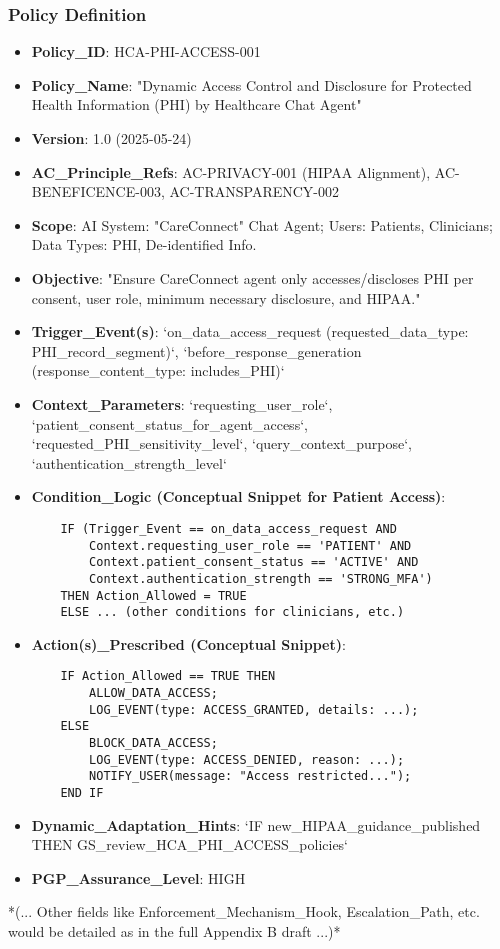 \documentclass[sigconf,review,anonymous=false]{acmart} %
\begin{document}
\subsubsection{Policy Definition}
\begin{itemize}
    \item \textbf{Policy\_ID}: HCA-PHI-ACCESS-001
    \item \textbf{Policy\_Name}: "Dynamic Access Control and Disclosure for Protected Health Information (PHI) by Healthcare Chat Agent"
    \item \textbf{Version}: 1.0 (2025-05-24)
    \item \textbf{AC\_Principle\_Refs}: AC-PRIVACY-001 (HIPAA Alignment), AC-BENEFICENCE-003, AC-TRANSPARENCY-002
    \item \textbf{Scope}: AI System: "CareConnect" Chat Agent; Users: Patients, Clinicians; Data Types: PHI, De-identified Info.
    \item \textbf{Objective}: "Ensure CareConnect agent only accesses/discloses PHI per consent, user role, minimum necessary disclosure, and HIPAA."
    \item \textbf{Trigger\_Event(s)}: `on_data_access_request (requested_data_type: PHI_record_segment)`, `before_response_generation (response_content_type: includes_PHI)`
    \item \textbf{Context\_Parameters}: `requesting_user_role`, `patient_consent_status_for_agent_access`, `requested_PHI_sensitivity_level`, `query_context_purpose`, `authentication_strength_level`
    \item \textbf{Condition\_Logic (Conceptual Snippet for Patient Access)}:
    \begin{verbatim}
    IF (Trigger_Event == on_data_access_request AND
        Context.requesting_user_role == 'PATIENT' AND
        Context.patient_consent_status == 'ACTIVE' AND
        Context.authentication_strength == 'STRONG_MFA')
    THEN Action_Allowed = TRUE
    ELSE ... (other conditions for clinicians, etc.)
    \end{verbatim}
    \item \textbf{Action(s)\_Prescribed (Conceptual Snippet)}:
    \begin{verbatim}
    IF Action_Allowed == TRUE THEN
        ALLOW_DATA_ACCESS;
        LOG_EVENT(type: ACCESS_GRANTED, details: ...);
    ELSE
        BLOCK_DATA_ACCESS;
        LOG_EVENT(type: ACCESS_DENIED, reason: ...);
        NOTIFY_USER(message: "Access restricted...");
    END IF
    \end{verbatim}
    \item \textbf{Dynamic\_Adaptation\_Hints}: `IF new_HIPAA_guidance_published THEN GS_review_HCA_PHI_ACCESS_policies`
    \item \textbf{PGP\_Assurance\_Level}: HIGH
\end{itemize}
*(... Other fields like Enforcement\_Mechanism\_Hook, Escalation\_Path, etc. would be detailed as in the full Appendix B draft ...)*
\end{document}
